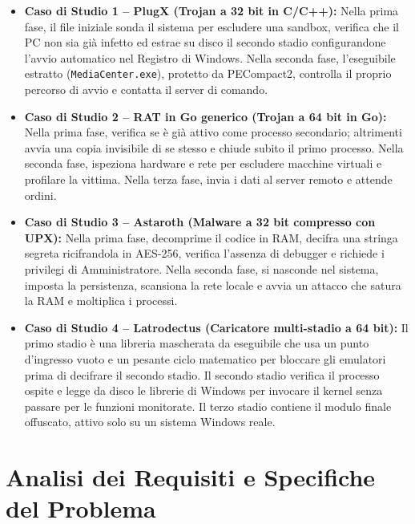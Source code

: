 \documentclass[11pt, a4paper]{article}
\begin{document}
	\begin{itemize}
		\item \textbf{Caso di Studio 1 -- PlugX (Trojan a 32 bit in C/C++):} Nella prima fase, il file iniziale sonda il sistema per escludere una sandbox, verifica che il PC non sia già infetto ed estrae su disco il secondo stadio configurandone l'avvio automatico nel Registro di Windows. Nella seconda fase, l'eseguibile estratto (\texttt{MediaCenter.exe}), protetto da PECompact2, controlla il proprio percorso di avvio e contatta il server di comando.
		
		\item \textbf{Caso di Studio 2 -- RAT in Go generico (Trojan a 64 bit in Go):} Nella prima fase, verifica se è già attivo come processo secondario; altrimenti avvia una copia invisibile di se stesso e chiude subito il primo processo. Nella seconda fase, ispeziona hardware e rete per escludere macchine virtuali e profilare la vittima. Nella terza fase, invia i dati al server remoto e attende ordini.
		
		\item \textbf{Caso di Studio 3 -- Astaroth (Malware a 32 bit compresso con UPX):} Nella prima fase, decomprime il codice in RAM, decifra una stringa segreta ricifrandola in AES-256, verifica l'assenza di debugger e richiede i privilegi di Amministratore. Nella seconda fase, si nasconde nel sistema, imposta la persistenza, scansiona la rete locale e avvia un attacco che satura la RAM e moltiplica i processi.
		
		\item \textbf{Caso di Studio 4 -- Latrodectus (Caricatore multi-stadio a 64 bit):} Il primo stadio è una libreria mascherata da eseguibile che usa un punto d'ingresso vuoto e un pesante ciclo matematico per bloccare gli emulatori prima di decifrare il secondo stadio. Il secondo stadio verifica il processo ospite e legge da disco le librerie di Windows per invocare il kernel senza passare per le funzioni monitorate. Il terzo stadio contiene il modulo finale offuscato, attivo solo su un sistema Windows reale.
	\end{itemize}
	
	\section{Analisi dei Requisiti e Specifiche del Problema}
	
\end{document}
